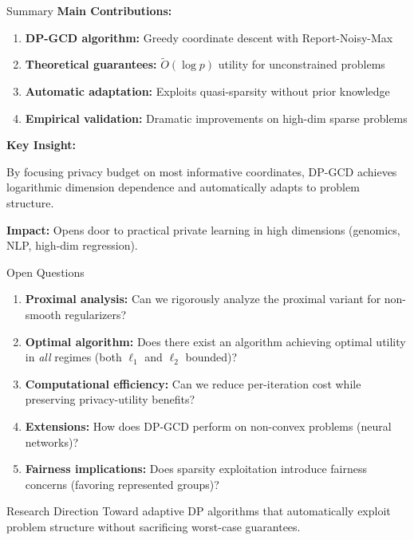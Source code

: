 \documentclass[10pt]{beamer}
\begin{document}
\begin{frame}{Summary}
\textbf{Main Contributions:}
\begin{enumerate}
\item \textbf{DP-GCD algorithm:} Greedy coordinate descent with Report-Noisy-Max
\item \textbf{Theoretical guarantees:} $\tilde{O}(\log p)$ utility for unconstrained problems
\item \textbf{Automatic adaptation:} Exploits quasi-sparsity without prior knowledge
\item \textbf{Empirical validation:} Dramatic improvements on high-dim sparse problems
\end{enumerate}

\vspace{1em}
\textbf{Key Insight:}
\begin{block}{}
By focusing privacy budget on \alert{most informative} coordinates, DP-GCD achieves logarithmic dimension dependence and automatically adapts to problem structure.
\end{block}

\vspace{1em}
\textbf{Impact:} Opens door to practical private learning in high dimensions (genomics, NLP, high-dim regression).
\end{frame}

\begin{frame}{Open Questions}
\begin{enumerate}
\item \textbf{Proximal analysis:} Can we rigorously analyze the proximal variant for non-smooth regularizers?

\item \textbf{Optimal algorithm:} Does there exist an algorithm achieving optimal utility in \emph{all} regimes (both $\ell_1$ and $\ell_2$ bounded)?

\item \textbf{Computational efficiency:} Can we reduce per-iteration cost while preserving privacy-utility benefits?

\item \textbf{Extensions:} How does DP-GCD perform on non-convex problems (neural networks)?

\item \textbf{Fairness implications:} Does sparsity exploitation introduce fairness concerns (favoring represented groups)?
\end{enumerate}

\vspace{1em}
\begin{alertblock}{Research Direction}
Toward adaptive DP algorithms that automatically exploit problem structure without sacrificing worst-case guarantees.
\end{alertblock}
\end{frame}
\end{document}
